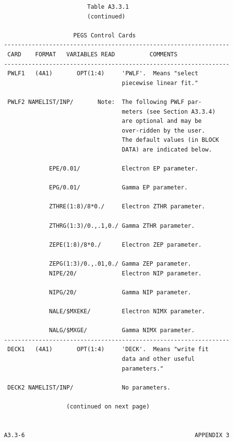 \newpage {} \begin{verbatim}
                         Table A3.3.1
                         (continued)
 
                     PEGS Control Cards
 -----------------------------------------------------------------
  CARD    FORMAT   VARIABLES READ          COMMENTS
 -----------------------------------------------------------------
  PWLF1   (4A1)       OPT(1:4)     'PWLF'.  Means "select
                                   piecewise linear fit."
 
  PWLF2 NAMELIST/INP/       Note:  The following PWLF par-
                                   meters (see Section A3.3.4)
                                   are optional and may be
                                   over-ridden by the user.
                                   The default values (in BLOCK
                                   DATA) are indicated below.
 
              EPE/0.01/            Electron EP parameter.
 
              EPG/0.01/            Gamma EP parameter.
 
              ZTHRE(1:8)/8*0./     Electron ZTHR parameter.
 
              ZTHRG(1:3)/0.,.1,0./ Gamma ZTHR parameter.
 
              ZEPE(1:8)/8*0./      Electron ZEP parameter.
 
              ZEPG(1:3)/0.,.01,0./ Gamma ZEP parameter.
              NIPE/20/             Electron NIP parameter.
 
              NIPG/20/             Gamma NIP parameter.
 
              NALE/$MXEKE/         Electron NIMX parameter.
 
              NALG/$MXGE/          Gamma NIMX parameter.
 -----------------------------------------------------------------
  DECK1   (4A1)       OPT(1:4)     'DECK'.  Means "write fit
                                   data and other useful 
                                   parameters."
 
  DECK2 NAMELIST/INP/              No parameters.

                   (continued on next page)


 A3.3-6                                                 APPENDIX 3
\end{verbatim} 
